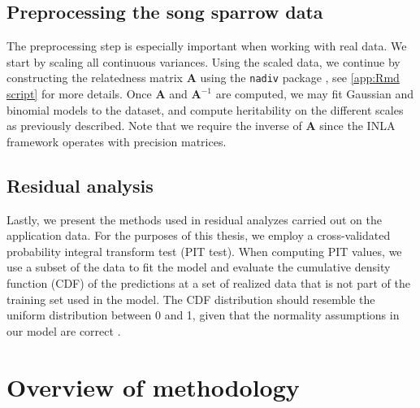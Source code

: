 \subsection{Preprocessing the song sparrow data}
The preprocessing step is especially important when working with real data. We start by scaling all continuous variances. Using the scaled data, we continue by constructing the relatedness matrix $\bm A$ using the \texttt{nadiv} package \autocite{wolak2012-nadiv}, see \autoref{app:Rmd script} for more details.
Once $\bm A$ and $\bm A^{-1}$ are computed, we may fit Gaussian and binomial models to the dataset, and compute heritability on the different scales as previously described. Note that we require the inverse of $\bm A$ since the INLA framework operates with precision matrices. 

\subsection{Residual analysis}
Lastly, we present the methods used in residual analyzes carried out on the application data. For the purposes of this thesis, we employ a cross-validated probability integral transform test (PIT test). When computing PIT values, we use a subset of the data to fit the model and evaluate the cumulative density function (CDF) of the predictions at a set of realized data that is not part of the training set used in the model. The CDF distribution should resemble the uniform distribution between 0 and 1, given that the normality assumptions in our model are correct \autocite{brinla2018, pitvalues}.

\section{Overview of methodology}

